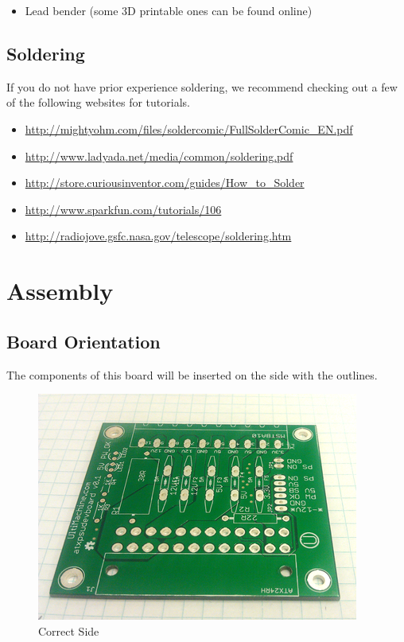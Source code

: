 \begin{itemize}
\itemsep1pt\parskip0pt
\item
  Lead bender (some 3D printable ones can be found online)
\end{itemize}

\subsection{Soldering}

If you do not have prior experience soldering, we recommend checking out
a few of the following websites for tutorials.

\begin{itemize}
\itemsep1pt\parskip0pt
\item
  \url{http://mightyohm.com/files/soldercomic/FullSolderComic_EN.pdf}
\item
  \url{http://www.ladyada.net/media/common/soldering.pdf}
\item
  \url{http://store.curiousinventor.com/guides/How_to_Solder}
\item
  \url{http://www.sparkfun.com/tutorials/106}
\item
  \url{http://radiojove.gsfc.nasa.gov/telescope/soldering.htm}
\end{itemize}

\section{Assembly}

\subsection{Board Orientation}

The components of this board will be inserted on the side with the
outlines.

\begin{figure}[H]
\centering
\includegraphics{./png/correct-side.png}
\caption{Correct Side}
\end{figure}

